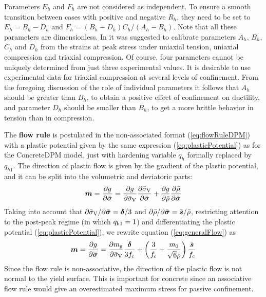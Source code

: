 \documentclass[a4paper]{article}
\newcommand{\mbf}[1]{\mbox{\boldmath$#1$}}
\begin{document}
Parameters $E_h$ and $F_h$ are not considered as independent.
To ensure a smooth transition between cases with positive and
negative $R_h$, they need to be set to $E_h=B_h-D_h$ and
$F_h=(B_h-D_h)C_h/(A_h-B_h)$. Note that all these parameters
are dimensionless. In \cite{GraXenNys13} it was suggested to
calibrate parameters $A_h$, $B_h$, $C_h$ and $D_h$ from the strains
at peak stress under uniaxial tension, uniaxial compression and triaxial
compression. Of course, four parameters cannot be uniquely
determined from just three experimental values. It is desirable to
use experimental data for triaxial compression at
several levels of confinement. From the foregoing discussion of the role
of individual parameters it follows that $A_h$ should be greater 
than $B_h$, to obtain a positive effect of confinement on ductility,
and parameter $D_h$ should be  smaller than $B_h$, to get a more brittle behavior
in tension than in compression. 

The {\bf flow rule} is postulated in the non-associated format (\ref{eq:flowRuleDPM})
with a plastic potential given  by the same expression (\ref{eq:plasticPotential})
as for the ConcreteDPM model, just with hardening variable $q_h$ formally replaced by $q_{h1}$.
The direction of plastic flow is given by the gradient of the plastic potential,
and it can be split into the volumetric and deviatoric parts:
%
\begin{equation}\label{eq:generalFlow}
\boldsymbol{m} = \dfrac{\partial g}{\partial \bar{\boldsymbol{\sigma}} } = \frac{\partial g}{\partial \bar{\sigma}_{\rm V}} \frac{\partial \bar{\sigma}_{\rm V}}{\partial \bar{\boldsymbol{\sigma}}} + \frac{\partial g}{\partial \bar{\rho}} \frac{\partial \bar{\rho} }{\partial \bar{\boldsymbol{\sigma}}}
\end{equation}
Taking into account that $\partial\bar{\sigma}_{\rm V}/\partial\bar{\boldsymbol{\sigma}}=\boldsymbol{\delta}/3$ and $\partial\bar{\rho}/\partial\bar{\boldsymbol{\sigma}}=\bar{\mbf{s}}/\bar\rho$, restricting attention to the post-peak regime (in which $q_{\rm h1} = 1$) and differentiating the plastic potential (\ref{eq:plasticPotential}), we rewrite equation (\ref{eq:generalFlow}) as
\begin{equation}\label{eq:detailedFlow}
\mbf{m} = \dfrac{\partial g}{\partial \bar{\boldsymbol{\sigma}}} =  \frac{{\partial}{m_{\rm g}}}{{\partial}{\bar{\sigma}_{\rm V}}} \frac{\boldsymbol{\delta}}{3f_{\rm c}} 
 + \left(\frac{3}{f_{\rm c}} + \frac{m_0}{\sqrt{6}\bar\rho} \right)\frac{\bar{\mbf{s}}}{f_{\rm c}}
\end{equation}
Since the flow rule is non-associative, the direction of the plastic flow is not normal to the yield surface. This is important for concrete since an associative flow rule would give an overestimated maximum stress for passive confinement. 
\end{document}
